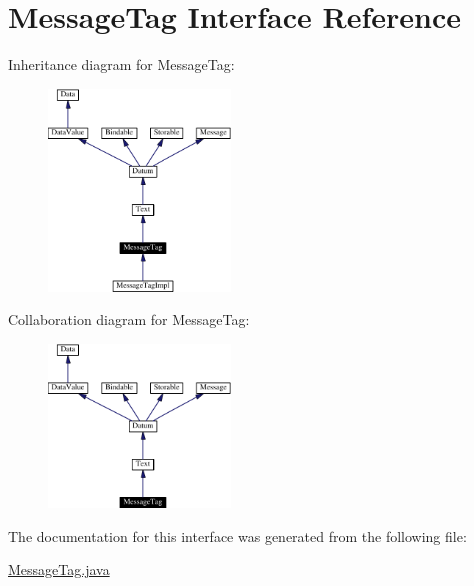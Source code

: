 \hypertarget{interfaceMessageTag}{
\section{Message\-Tag  Interface Reference}
\label{interfaceMessageTag}
}
Inheritance diagram for Message\-Tag:\begin{figure}[H]
\begin{center}
\leavevmode
\includegraphics[width=137pt]{interfaceMessageTag__inherit__graph}
\end{center}
\end{figure}
Collaboration diagram for Message\-Tag:\begin{figure}[H]
\begin{center}
\leavevmode
\includegraphics[width=137pt]{interfaceMessageTag__coll__graph}
\end{center}
\end{figure}


The documentation for this interface was generated from the following file:\begin{CompactItemize}
\item 
\hyperlink{MessageTag_8java-source}{Message\-Tag.java}\end{CompactItemize}
